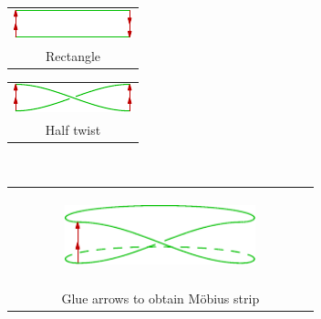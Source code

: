 \begin{center}
\begin{tabular}{c}
\includegraphics[scale=3.4]{relations-10-mobius}\\
Rectangle
\end{tabular}
\hspace*{.5cm}
\begin{tabular}{c}
\includegraphics[scale=3.4]{relations-11-mobius}\\
Half twist
\end{tabular}\\[15pt]
\begin{tabular}{c}
\includegraphics[width=0.65\textwidth,height=75pt]{relations-12-mobius}\\
Glue arrows to obtain Möbius strip\\[15pt]
\end{tabular}
\end{center}


